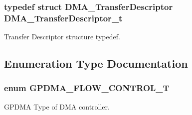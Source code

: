 \subsubsection[{\texorpdfstring{D\+M\+A\+\_\+\+Transfer\+Descriptor\+\_\+t}{DMA_TransferDescriptor_t}}]{\setlength{\rightskip}{0pt plus 5cm}typedef struct {\bf D\+M\+A\+\_\+\+Transfer\+Descriptor}  {\bf D\+M\+A\+\_\+\+Transfer\+Descriptor\+\_\+t}}\hypertarget{group__GPDMA__17XX__40XX_ga23dbdf610f0d1f61ae30a69944bbee55}{}\label{group__GPDMA__17XX__40XX_ga23dbdf610f0d1f61ae30a69944bbee55}


Transfer Descriptor structure typedef. 



\subsection{Enumeration Type Documentation}
\subsubsection[{\texorpdfstring{G\+P\+D\+M\+A\+\_\+\+F\+L\+O\+W\+\_\+\+C\+O\+N\+T\+R\+O\+L\+\_\+T}{GPDMA_FLOW_CONTROL_T}}]{\setlength{\rightskip}{0pt plus 5cm}enum {\bf G\+P\+D\+M\+A\+\_\+\+F\+L\+O\+W\+\_\+\+C\+O\+N\+T\+R\+O\+L\+\_\+T}}\hypertarget{group__GPDMA__17XX__40XX_ga2cb59b641cd840f22780c44be1208133}{}\label{group__GPDMA__17XX__40XX_ga2cb59b641cd840f22780c44be1208133}


G\+P\+D\+MA Type of D\+MA controller. 


